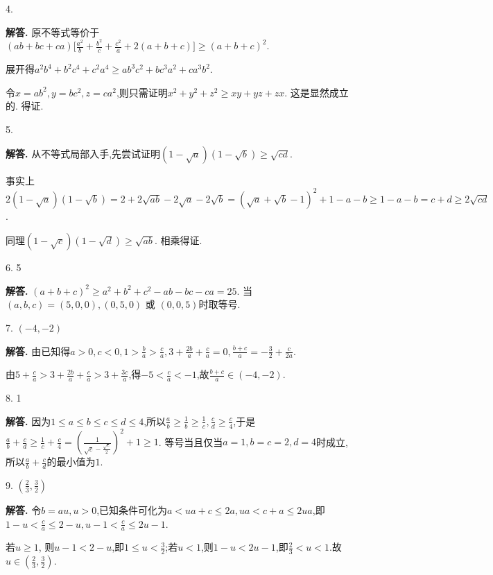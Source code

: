 \documentclass[12pt,a4paper,oneside]{ctexart}
\newenvironment{solution}{\par\noindent\textbf{解答. }}{\\\par}
\begin{document}
4. \begin{solution}
    原不等式等价于$ (ab+bc+ca)\bigg[\frac{a^2}{b}+\frac{b^2}{c}+\frac{c^2}{a}+2(a+b+c)\bigg]\geqslant (a+b+c)^2 $.

    展开得$ a^2b^4+b^2c^4+c^2a^4\geqslant ab^3c^2+bc^3a^2+ca^3b^2 $.

    令$ x=ab^2,y=bc^2,z=ca^2 $,则只需证明$ x^2+y^2+z^2\geqslant xy+yz+zx $. 这是显然成立的. 得证.
\end{solution}

5.
\begin{solution}
    从不等式局部入手,先尝试证明$ (1-\sqrt{a})(1-\sqrt{b})\geqslant \sqrt{cd} $.

    事实上$ 2(1-\sqrt{a})(1-\sqrt{b})=2+2\sqrt{ab}-2\sqrt{a}-2\sqrt{b}=(\sqrt{a}+\sqrt{b}-1)^2+1-a-b\geqslant 1-a-b=c+d\geqslant 2\sqrt{cd} $.

    同理$ (1-\sqrt{c})(1-\sqrt{d})\geqslant \sqrt{ab} $. 相乘得证.
\end{solution}

6. 5
\begin{solution}
    $ (a+b+c)^2\geqslant a^2+b^2+c^2-ab-bc-ca=25 $. 当$ (a,b,c)=(5,0,0), (0,5,0)$ 或 $ (0,0,5) $时取等号.
\end{solution}

7. $ (-4,-2) $
\begin{solution}
    由已知得$ a>0, c<0, 1>\frac{b}{a}>\frac{c}{a}, 3+\frac{2b}{a}+\frac{c}{a}=0, \frac{b+c}{a}=-\frac{3}{2}+\frac{c}{2a} $.

    由$ 5+\frac{c}{a}>3+\frac{2b}{a}+\frac{c}{a}>3+\frac{3c}{a} $,得$ -5<\frac{c}{a}<-1 $,故$ \frac{b+c}{a}\in (-4,-2) $.
\end{solution}

8. 1
\begin{solution}
    因为$ 1\leqslant a\leqslant b\leqslant c\leqslant d\leqslant 4 $,所以$ \frac{a}{b}\geqslant \frac{1}{b}\geqslant \frac{1}{c}, \frac{c}{d}\geqslant \frac{c}{4} $,于是$ \frac{a}{b}+\frac{c}{d}\geqslant \frac{1}{c}+\frac{c}{4}=(\frac{1}{\sqrt{c}-\frac{\sqrt{c}}{2}})^2+1\geqslant 1 $. 等号当且仅当$ a=1, b=c=2, d=4 $时成立,所以$ \frac{a}{b}+\frac{c}{d} $的最小值为$ 1 $.
\end{solution}

9. $ (\frac{2}{3},\frac{3}{2}) $
\begin{solution}
    令$ b=au,u>0 $,已知条件可化为$ a<ua+c\leqslant 2a, ua<c+a\leqslant 2ua $,即$ 1-u<\frac{c}{a}\leqslant 2-u, u-1<\frac{c}{a}\leqslant 2u-1 $.

    若$ u\geqslant 1 $, 则$ u-1<2-u $,即$ 1\leqslant u<\frac{3}{2} $;若$ u<1 $,则$ 1-u<2u-1 $,即$ \frac{2}{3}<u<1 $.故$ u\in (\frac{2}{3},\frac{3}{2}) $.
\end{solution}
\end{document}
